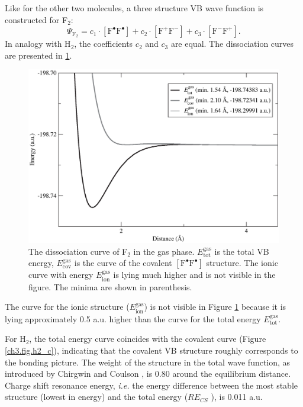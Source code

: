 Like for the other two molecules, a three structure VB wave function is constructed for F$_2$:
\begin{equation}
\nonumber
\Psi_{\mathrm{F_2}} = c_1\cdot [\mathrm{F}^\bullet \mathrm{F}^\bullet] + c_2 \cdot [\mathrm{F}^{+}\mathrm{F}^{-}] + c_3 \cdot [\mathrm{F}^{-}\mathrm{F}^{+}]. 
\end{equation}
In analogy with H$_2$, the coefficients $c_2$ and $c_3$ are equal. The dissociation curves are presented in \ref{ch3.fig.f2_c}.
\begin{figure}[hbtp]
\begin{center}
\includegraphics[scale=0.6]{dissociation/figures/f2_g.eps}
\end{center}
\caption{The dissociation curve of F$_2$ in the gas phase. $E_\mathrm{tot}^\mathrm{gas}$ is the total VB energy, $E_\mathrm{cov}^\mathrm{gas}$ is the curve of the covalent $[\mathrm{F^\bullet F^\bullet}]$ structure. The ionic curve with energy $E_\mathrm{ion}^\mathrm{gas}$ is lying much higher and is not visible in the figure. The minima are shown in parenthesis.}
\label{ch3.fig.f2_c}
\end{figure}
The curve for the ionic structure ($E_\mathrm{ion}^\mathrm{gas}$) is not visible in Figure \ref{ch3.fig.f2_c} because it is lying approximately 0.5 a.u. higher than the curve for the total energy $E_\mathrm{tot}^\mathrm{gas}$.

For H$_2$, the total energy curve coincides with the covalent curve (Figure \ref{ch3.fig.h2_c}), indicating that the covalent VB structure roughly corresponds to the bonding picture. The weight of the structure in the total wave function, as introduced by Chirgwin and Coulson \cite{chirgwin}, is 0.80 around the equilibrium distance. Charge shift resonance energy, \textit{i.e.} the energy difference between the most stable structure (lowest in energy) and the total energy ($RE_{CS}$ \cite{cs1}), is 0.011 a.u. 

